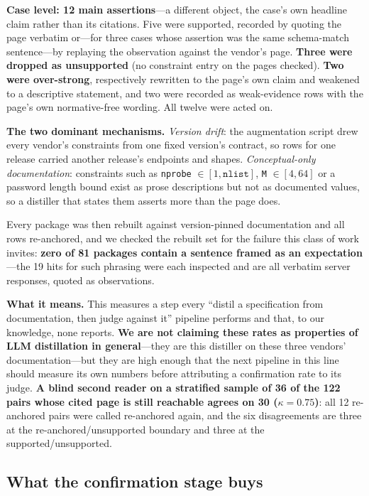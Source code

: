\documentclass[acmsmall,screen,review,anonymous]{acmart}
\begin{document}
\textbf{Case level: 12 main assertions}---a different object, the case's own headline claim rather
than its citations. Five were supported, recorded by quoting the page verbatim or---for three cases
whose assertion was the same schema-match sentence---by replaying the observation against the vendor's
page. \textbf{Three were dropped as unsupported} (no constraint entry on the pages checked).
\textbf{Two were over-strong}, respectively rewritten to the page's own claim and weakened to a
descriptive statement, and two were recorded as weak-evidence rows with the page's own normative-free
wording. All twelve were acted on.

\textbf{The two dominant mechanisms.} \emph{Version drift}: the augmentation script drew every
vendor's constraints from one fixed version's contract, so rows for one release carried another
release's endpoints and shapes. \emph{Conceptual-only documentation}: constraints such as
\texttt{nprobe} $\in [1, \texttt{nlist}]$, \texttt{M} $\in [4, 64]$ or a password length bound exist
as prose descriptions but not as documented values, so a distiller that states them asserts more
than the page does.

Every package was then rebuilt against version-pinned documentation and all rows re-anchored, and we
checked the rebuilt set for the failure this class of work invites: \textbf{zero of 81 packages
contain a sentence framed as an expectation}---the 19 hits for such phrasing were each inspected and
are all verbatim server responses, quoted as observations.

\textbf{What it means.} This measures a step every ``distil a specification from documentation, then
judge against it'' pipeline performs and that, to our knowledge, none reports. \textbf{We are not
claiming these rates as properties of LLM distillation in general}---they are this distiller on
these three vendors' documentation---but they
are high enough that the next pipeline in this line should measure its own numbers before
attributing a confirmation rate to its judge. \textbf{A blind second reader on a stratified sample
of 36 of the 122 pairs whose cited page is still reachable agrees on 30 (\textbf{$\kappa = 0.75$})}:
all 12 re-anchored pairs were called re-anchored again, and the six disagreements are three at the
re-anchored/unsupported boundary and three at the supported/unsupported.

\subsection{What the confirmation stage buys}
\label{sec:buys}
\end{document}
